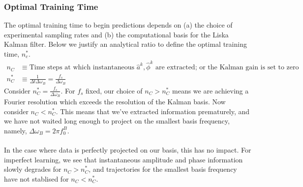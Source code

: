 \subsubsection{Optimal Training Time}
The optimal training time to begin predictions depends on (a) the choice of experimental sampling rates and (b) the computational basis for the Liska Kalman filter. Below we justify an analytical ratio to define the optimal training time, $n_c^*$. 
\begin{align}
n_C  &\equiv \text{Time steps at which instantaneous $\hat{a}^k, \hat{\phi}^k$ are extracted; or the Kalman gain is set to zero} \\
n_C^* &\equiv \frac{1}{\Delta t \Delta \omega_B} = \frac{f_s}{\Delta \omega_B} \label{eqn:sec:ap_liska_fixedbasis_nC}
\end{align}
Consider $n_C^* = \frac{f_s}{\Delta \omega_B}$.  For $f_s$ fixed, our choice of $n_C > n_C^* $ means we are achieving a Fourier resolution which exceeds the resolution of the Kalman basis. Now consider $n_C < n_C^*$. This means that we've extracted information prematurely, and we have not waited long enough to project on the smallest basis frequency, namely, $\Delta \omega_B = 2 \pi f_0^B$. 
\\
\\
In the case where data is perfectly projected on our basis, this has no impact. For imperfect learning, we see that instantaneous amplitude and phase information slowly degrades for $n_C > n_C^*$, and trajectories for the smallest basis frequency have not stablised for $n_C < n_C^*$.

